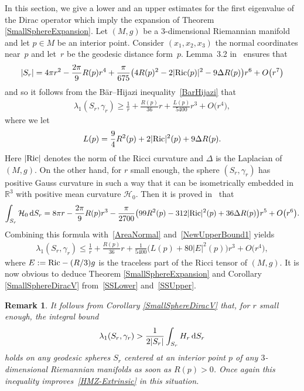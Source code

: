 \documentclass[pdftex]{sigma}
\numberwithin{equation}{section}
\newtheorem{Remark}[Theorem]{Remark}
\begin{document}
In this section, we give a lower and an upper estimates for the first eigenvalue of the Dirac operator which imply the expansion of Theorem \ref{SmallSphereExpansion}. Let $(M,g)$ be a $3$-dimensional Riemannian manifold and let $p\in M$ be an interior point. Consider $(x_1,x_2,x_3)$ the normal coordinates near~$p$ and let~$r$ be the geodesic distance form~$p$. Lemma~3.2 in~\cite{FanShiTam} ensures that
\begin{gather}\label{AreaNormal}
|S_r|=4\pi r^2-\frac{2\pi}{9}R(p)r^4+\frac{\pi}{675}\big(4R(p)^2-2|{\rm Ric}(p)|^2-9\Delta R(p)\big)r^6+O\big(r^7\big)
\end{gather}
and so it follows from the B\"ar--Hijazi inequality~\eqref{BarHijazi} that
\begin{gather}\label{SSLower}
\lambda_1(S_r,\gamma_r)\geq\frac{1}{r}+\frac{R(p)}{36}r+\frac{L(p)}{5400}r^3+O\big(r^4\big),
\end{gather}
where we let
\begin{gather*}
L(p)=\frac{9}{4}R^2(p)+2|{\rm Ric}|^2(p)+9\Delta R(p).
\end{gather*}
Here $|{\rm Ric}|$ denotes the norm of the Ricci curvature and $\Delta$ is the Laplacian of $(M,g)$. On the other hand, for $r$ small enough, the sphere $(S_r,\gamma_r)$ has positive Gauss curvature in such a way that it can be isometrically embedded in $\mathbb{R}^3$ with positive mean curvature $\mathcal{H}_0$. Then it is proved in~\cite[p. 66]{FanShiTam} that
\begin{gather*}
\int_{S_r}\mathcal{H}_0\,{\rm d}S_r=8\pi r-\frac{2\pi}{9}R(p)r^3-\frac{\pi}{2700}\big(99R^2(p)-312|{\rm Ric}|^2(p)+36\Delta R(p)\big)r^5+O\big(r^6\big).
\end{gather*}
Combining this formula with~\eqref{AreaNormal} and~\eqref{NewUpperBound1} yields
\begin{gather}\label{SSUpper}
\lambda_1(S_r,\gamma_r)\leq\frac{1}{r}+\frac{R(p)}{36}r+\frac{1}{5400}\big(L(p)+80|E|^2(p)\big)r^3+O\big(r^4\big),
\end{gather}
where $E:={\rm Ric}-(R/3)g$ is the traceless part of the Ricci tensor of $(M,g)$. It is now obvious to deduce Theorem \ref{SmallSphereExpansion} and Corollary \ref{SmallSphereDiracV} from~\eqref{SSLower} and~\eqref{SSUpper}.

\begin{Remark}
It follows from Corollary \ref{SmallSphereDiracV} that, for $r$ small enough, the integral bound
\begin{gather*}%
\lambda_1(S_r,\gamma_r)>\frac{1}{2|S_r|}\int_{S_r}H_r\,{\rm d}S_r
\end{gather*}
holds on any geodesic spheres $S_r$ centered at an interior point $p$ of any $3$-dimensional Riemannian manifolds as soon as $R(p)>0$. Once again this inequality improves~\eqref{HMZ-Extrinsic} in this situation.
\end{Remark}
\end{document}
